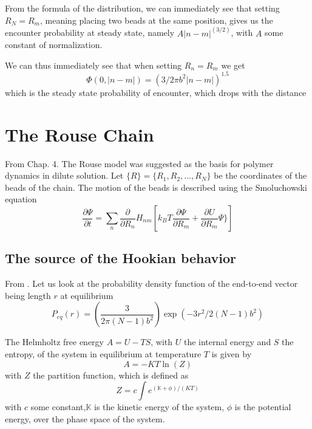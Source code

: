 \documentclass{report}
\begin{document}
From the formula of the distribution, we can immediately see that setting $R_N=R_m$, meaning placing two beads at the same position, gives us the encounter probability at steady state, namely $A|n-m|^(3/2)$, with $A$ some constant of normalization. 

We can thus immediately see that when setting $R_n=R_m$ we get 
\begin{equation*}
\Phi(0,|n-m|)=(3/2\pi b^2 |n-m|)^{1.5}
\end{equation*}
which is the steady state probability of encounter, which drops with the distance





\section{The Rouse Chain}\label{section_theRouseChain}
From \cite{doi1986theory} Chap. 4. The Rouse model was suggested as the basis for polymer dynamics in dilute solution. Let $\{R\}=\{R_1,R_2,...,R_N\}$ be the coordinates of the beads of the chain. The motion of the beads is described using the Smoluchowski equation
\begin{equation*}
\frac{\partial \Psi}{\partial t }=\sum_n \frac{\partial}{\partial R_n}H_{nm}\left[k_BT\frac{\partial \Psi}{\partial R_m}+\frac{\partial U}{\partial R_m}\Psi\}\right]
\end{equation*}

\subsection{The source of the Hookian behavior}\label{subsection_sourceOfTheHookianBehavior}
From \cite{bird1987dynamics}. Let us look at the probability density function of the end-to-end vector being length $r$ at equilibrium
\begin{equation*}
P_{eq}(r)= \left(\frac{3}{2\pi (N-1)b^2}\right)\exp(-3r^2/2(N-1)b^2)
\end{equation*}

 The Helmholtz free energy $A=U-TS$, with $U$ the internal energy and $S$ the entropy, of the system in equilibrium at temperature $T$ is given by 
\begin{equation*}
A=-KT\ln(Z)
\end{equation*}
with $Z$ the partition function, which is defined as 
\begin{equation*}
Z=c\int e^{(\mathbb{K+\phi})/(KT)}
\end{equation*}
with $c$ some constant,$\mathbb{K}$ is the kinetic energy of the system, $\mathbb{\phi}$ is the potential energy, over the phase space of the system. 
\end{document}
